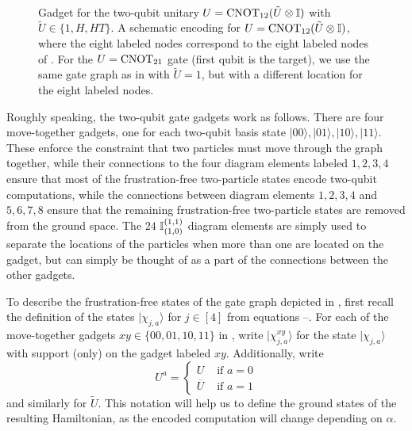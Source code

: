 \documentclass[../thesis-main/thesis-main]{subfiles}
\begin{document}
\begin{figure}
\centering 
{}\\
\caption[Two-qubit gadget]{ Gadget for the
 two-qubit unitary $U=\mathrm{CNOT}_{12}(\tilde U\otimes\mathbb{I})$ with $\tilde U\in \{1,H,HT\}$.  A schematic encoding for $U=\mathrm{CNOT}_{12}(\tilde U\otimes \mathbb{I})$, where the eight labeled nodes correspond to the eight labeled nodes of .
 For the $U=\mathrm{CNOT}_{21}$ gate (first qubit is the target), we use the same gate graph as in  with $\tilde U=1$, but with a different location for the eight labeled nodes.}
\label{fig:GVcnot_tot}
\end{figure}

Roughly speaking, the two-qubit gate gadgets work as follows.  There are four move-together gadgets, one for each two-qubit basis state $|00\rangle, |01\rangle, |10\rangle, |11\rangle$. These enforce the constraint that two particles must move through the graph together, while their connections to the four diagram elements labeled $1,2,3,4$ ensure that most of the frustration-free two-particle states encode two-qubit computations, while the connections between diagram elements $1,2,3,4$ and $5,6,7,8$ ensure that the remaining frustration-free two-particle states are removed from the ground space.   The $24$ $\mathbb{I}_{(1,0)}^{(1,1)}$ diagram elements are simply used to separate the locations of the particles when more than one are located on the gadget, but can simply be thought of as a part of the connections between the other gadgets.

To describe the frustration-free states of the gate graph depicted in , first recall the definition of the states $|\chi_{j,a}\rangle$ for $j\in [4]$  from equations --. For each of the move-together gadgets $xy\in\{00,01,10,11\}$ in , write 
$
|\chi_{j,a}^{xy}\rangle
$
for the state $|\chi_{j,a}\rangle$ with support (only) on the gadget labeled $xy$. Additionally, write 
\begin{equation}
  U^a=\begin{cases}
    U & \text{ if }a=0\\
    \overline{U} & \text{ if }a=1
  \end{cases}
\end{equation}
and similarly for $\tilde U$.  This notation will help us to define the ground states of the resulting Hamiltonian, as the encoded computation will change depending on $\alpha$.
\end{document}
